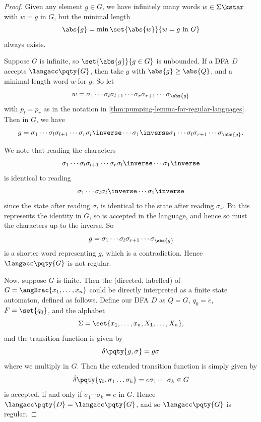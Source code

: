 \begin{proof}
    Given any element \(g \in G\), we have infinitely many words \(w \in \Sigma\kstar\) with \(w = g\) in \(G\), but the minimal length
    \[
        \abs{g} = \min\set{\abs{w}}{w = g\text{ in }G}
    \]
    always exists.

    Suppose \(G\) is infinite, so \(\set{\abs{g}}{g \in G}\) is unbounded. If a DFA \(D\) accepts \(\langacc\pqty{G}\), then take \(g\) with \(\abs{g} \geq \abs{Q}\), and a minimal length word \(w\) for \(g\). So let
    \[
        w = \sigma_1 \cdots \sigma_l \sigma_{l + 1} \cdots \sigma_r \sigma_{r + 1} \cdots \sigma_{\abs{g}}
    \]
    with \(p_l = p_r\) as in the notation in \autoref{thm:pumping-lemma-for-regular-languages}. Then in \(G\), we have
    \[
        g = \sigma_1 \cdots \sigma_l \sigma_{l + 1} \cdots \sigma_r \sigma_l\inverse \cdots \sigma_1 \inverse \sigma_1 \cdots \sigma_l \sigma_{r + 1} \cdots \sigma_{\abs{g}}.
    \]

    We note that reading the characters
    \[
        \sigma_1 \cdots \sigma_l \sigma_{l + 1} \cdots \sigma_r \sigma_l\inverse \cdots \sigma_1 \inverse
    \]
    is identical to reading
    \[
        \sigma_1 \cdots \sigma_l \sigma_l\inverse \cdots \sigma_1 \inverse
    \]
    since the state after reading \(\sigma_l\) is identical to the state after reading \(\sigma_r\). Bu this represents the identity in \(G\), so is accepted in the language, and hence so must the characters up to the inverse. So
    \[
        g = \sigma_1 \cdots \sigma_l \sigma_{r + 1} \cdots \sigma_{\abs{g}}
    \]
    is a shorter word representing \(g\), which is a contradiction. Hence \(\langacc\pqty{G}\) is not regular.

    Now, suppose \(G\) is finite. Then the (directed, labelled)  of \(G = \angBrac{x_1, \ldots, x_n}\) could be directly interpreted as a finite state automaton, defined as follows. Define our DFA \(D\) as \(Q = G\), \(q_0 = e\), \(F = \set{q_0}\), and the alphabet
    \[
        \Sigma = \set{x_1, \ldots, x_n, X_1, \ldots, X_n},
    \]
    and the transition function is given by
    \[
        \delta\pqty{g, \sigma} = g \sigma
    \]
    where we multiply in \(G\). Then the extended transition function is simply given by
    \[
        \hat{\delta} \pqty{q_0, \sigma_1 \ldots \sigma_k} = e \sigma_1 \cdots \sigma_k \in G
    \]
    is accepted, if and only if \(\sigma_1 \cdots \sigma_k = e\) in \(G\). Hence \(\langacc\pqty{D} = \langacc\pqty{G}\), and so \(\langacc\pqty{G}\) is regular.
\end{proof}

